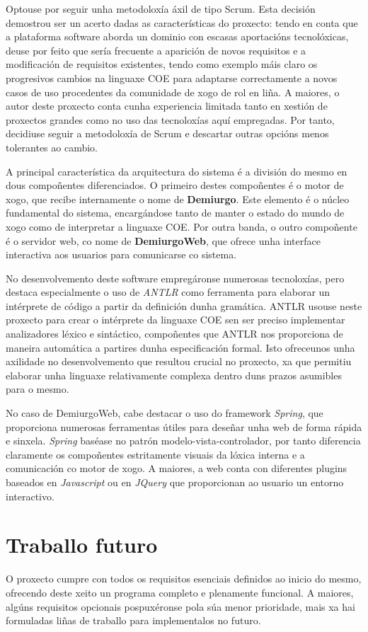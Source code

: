 Optouse por seguir unha metodoloxía áxil de tipo Scrum. Esta decisión demostrou
ser un acerto dadas as características do proxecto: tendo en conta que a
plataforma software aborda un dominio con escasas aportacións tecnolóxicas,
deuse por feito que sería frecuente a aparición de novos requisitos e a modificación de requisitos existentes, tendo como exemplo máis claro os progresivos cambios na linguaxe COE
para adaptarse correctamente a novos casos de uso procedentes da comunidade de
xogo de rol en liña.
A maiores, o autor deste proxecto conta cunha experiencia limitada tanto en
xestión de proxectos grandes como no uso das tecnoloxías aquí empregadas. Por
tanto, decidiuse seguir a metodoloxía de Scrum e descartar outras opcións menos
tolerantes ao cambio.

A principal característica da arquitectura do sistema é a división do mesmo en
dous compoñentes diferenciados. O primeiro destes compoñentes é o motor de xogo,
que recibe internamente o nome de \textbf{Demiurgo}. Este elemento é o
núcleo fundamental do sistema, encargándose tanto de manter o estado do mundo de
xogo como de interpretar a linguaxe COE. Por outra banda, o outro compoñente é o
servidor web, co nome de \textbf{DemiurgoWeb}, que ofrece unha interface
interactiva aos usuarios para comunicarse co sistema.

No desenvolvemento deste software empregáronse numerosas tecnoloxías, pero
destaca especialmente o uso de \textit{ANTLR} como ferramenta para elaborar un
intérprete de código a partir da definición dunha gramática.
ANTLR usouse neste proxecto para crear o intérprete da linguaxe COE sen ser
preciso implementar analizadores léxico e sintáctico, compoñentes que
ANTLR nos proporciona de maneira automática a partires dunha especificación
formal.
Isto ofreceunos unha axilidade no desenvolvemento que resultou crucial no proxecto, xa que permitiu elaborar unha
linguaxe relativamente complexa dentro duns prazos asumibles para o mesmo.

No caso de DemiurgoWeb, cabe destacar o uso do framework \textit{Spring}, que
proporciona numerosas ferramentas útiles para deseñar unha web de forma rápida e
sinxela. \textit{Spring} baséase no patrón modelo-vista-controlador, por
tanto diferencia claramente os compoñentes estritamente visuais da lóxica
interna e a comunicación co motor de xogo. A maiores, a web conta con diferentes
plugins baseados en \textit{Javascript} ou en \textit{JQuery} que proporcionan
ao usuario un entorno interactivo.


\section{Traballo futuro}
O proxecto cumpre con todos os requisitos esenciais definidos ao inicio do
mesmo, ofrecendo deste xeito un programa completo e plenamente funcional. A
maiores, algúns requisitos opcionais pospuxéronse pola súa menor prioridade,
mais xa hai formuladas liñas de traballo para implementalos no futuro.

